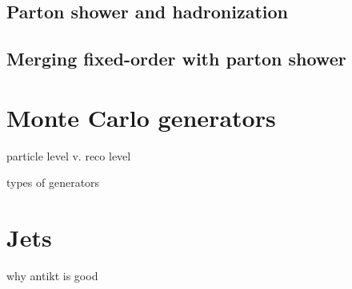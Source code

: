 \subsection{Parton shower and hadronization}

\subsection{Merging fixed-order with parton shower}

\section{Monte Carlo generators}
particle level v. reco level

types of generators

\section{Jets}
why antikt is good